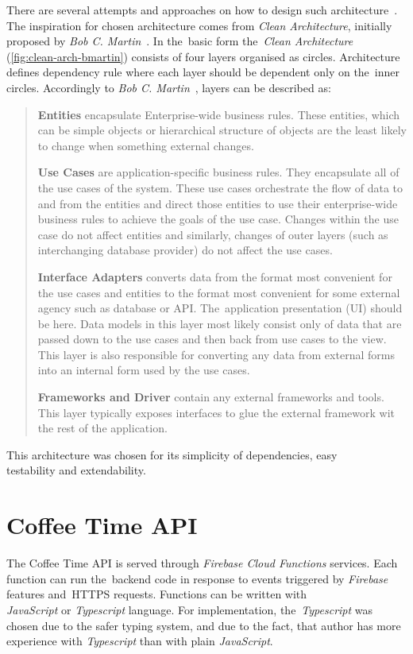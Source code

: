 There are several attempts and approaches on how to design such architecture~\cite{clean-architecture-article}. The inspiration for chosen architecture comes from \textit{Clean Architecture}, initially proposed by \textit{Bob C. Martin}~\cite{clean-architecture-book}. In the~basic form the~\textit{Clean Architecture} (\cref{fig:clean-arch-bmartin}) consists of four layers organised as circles. Architecture defines dependency rule where each layer should be dependent only on the~inner circles. Accordingly to \textit{Bob C. Martin}~\cite{clean-architecture-article}, layers can be described as:  

\begin{quote}
\textbf{Entities} encapsulate Enterprise-wide business rules. These entities, which can be simple objects or hierarchical structure of objects are the least likely to change when something external changes.

\textbf{Use Cases} are application-specific business rules. They encapsulate all of the use cases of the system. These use cases orchestrate the flow of data to and from the entities and direct those entities to use their enterprise-wide business rules to achieve the goals of the use case. Changes within the use case do not affect entities and similarly, changes of outer layers (such as interchanging database provider) do not affect the use cases. 

\textbf{Interface Adapters} converts data from the format most convenient for the use cases and entities to the format most convenient for some external agency such as database or API. The~application presentation (UI) should be here. Data models in this layer most likely consist only of data that are passed down to the use cases and then back from use cases to the view.  This layer is also responsible for converting any data from external forms into an internal form used by the use cases.

\textbf{Frameworks and Driver} contain any external frameworks and tools. This layer typically exposes interfaces to glue the external framework wit the rest of the application. 
\end{quote}

This architecture was chosen for its simplicity of dependencies, easy \\ testability and extendability. 
\section{Coffee Time API}
The Coffee Time API is served through \textit{Firebase Cloud Functions} services. Each function can run the~backend code in response to events triggered by \textit{Firebase} features and~HTTPS requests. Functions can be written with \\\textit{JavaScript} or \textit{Typescript} language. For implementation, the~\textit{Typescript} was chosen due to the safer typing system, and due to the fact, that author has more experience with \textit{Typescript} than with plain \textit{JavaScript}. 

